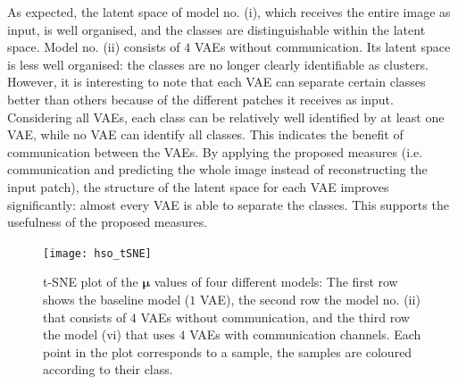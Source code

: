 As expected, the latent space of model no. (i), which receives the entire image as input, is well organised, and the classes are distinguishable within the latent space. Model no. (ii) consists of $4$ VAEs without communication. Its latent space is less well organised: the classes are no longer clearly identifiable as clusters. However, it is interesting to note that each VAE can separate certain classes better than others because of the different patches it receives as input. Considering all VAEs, each class can be relatively well identified by at least one VAE, while no VAE can identify all classes. This indicates the benefit of communication between the VAEs.
By applying the proposed measures (i.e. communication and predicting the whole image instead of reconstructing the input patch), the structure of the latent space for each VAE improves significantly: almost every VAE is able to separate the classes. This supports the usefulness of the proposed measures.

\begin{figure}[h]
    \centering
    \texttt{[image: hso\_tSNE]}
    \caption[t-SNE plot of the $\boldsymbol{\mu}$ values of different models]{t-SNE plot of the $\boldsymbol{\mu}$ values of four different models: The first row shows the baseline model ($1$ VAE), the second row the model no. (ii) that consists of $4$ VAEs without communication, and the third row the model (vi) that uses $4$ VAEs with communication channels. Each point in the plot corresponds to a sample, the samples are coloured according to their class.}
\end{figure}

